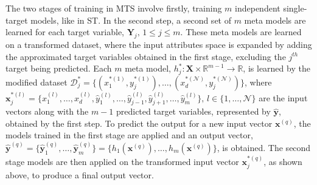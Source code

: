 \documentclass[preprint,12pt]{elsarticle}
\begin{document}
The two stages of training in MTS involve firstly, training $m$ independent single-target models, like in ST. In the second step, a second set of $m$ meta models are learned for each target variable, $\bm{Y}_j,\, 1 \leq j \leq m$. These meta models are learned on a transformed dataset, where the input attributes space is expanded by adding the approximated target variables obtained in the first stage, excluding the $j^{th}$ target being predicted. Each $m$ meta model, $h_j^* : \bm{X} \times \mathbb{R}^{m-1} \rightarrow \mathbb{R}$, is learned by the modified dataset $\mathcal{D}_j^* = \{(x_1^{*(1)},y_j^{*(1)}), \ldots, (x_d^{*(\mathcal{N})},y_j^{*(\mathcal{N})})\}$, where $\bm x_j^{*(l)} = \{x_1^{(l)}, \ldots, x_d^{(l)}, \hat{y}_1^{(l)}, \ldots, \hat{y}_{j-1}^{(l)}, \hat{y}_{j+1}^{(l)}, \ldots, \hat{y}_m^{(l)}\},\, l \in \{1, \ldots, \mathcal{N}\}$ are the input vectors along with the $m-1$ predicted target variables, represented by $\hat{\bm y}$, obtained by the first step. To predict the output for a new input vector $\bm{x}^{(q)}$, the models trained in the first stage are applied and an output vector, $\hat{\bm{y}}^{(q)} = \{\hat{\bm{y}}_1^{(q)}, \ldots, \hat{\bm{y}}_m^{(q)}\} = \{h_1(\bm{x}^{(q)}), \ldots, h_m(\bm{x}^{(q)})\}$, is obtained. The second stage models are then applied on the transformed input vector $\bm x_j^{*(q)}$, as shown above, to produce a final output vector.

\end{document}
